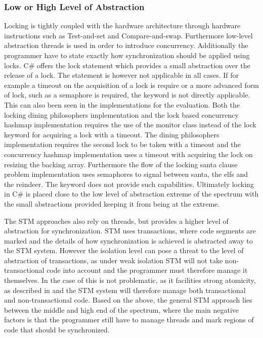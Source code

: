 \subsubsection{Low or High Level of Abstraction}\label{subsec:level_of_abstraction}
Locking is tightly coupled with the hardware architecture through hardware instructions such as Test-and-set and Compare-and-swap\cite[p. 1990]{scott2011sync}. Furthermore low-level abstraction threads is used in order to introduce concurrency. Additionally the programmer have to state exactly how synchronization should be applied using locks. C\# offers the lock  statement which provides a small abstraction over the release of a lock. The  statement is however not applicable in all cases. If for example a timeout on the acquisition of a lock is require or a more advanced form of lock, such as a semaphore is required, the  keyword is not directly applicable. This can also been seen in the implementations for the evaluation. Both the locking dining philosophers implementation and the lock based concurrency hashmap implementation requires the use of the monitor class instead of the lock keyword for acquiring a lock with a timeout. The dining philosophers implementation requires the second lock to be taken with a timeout and the concurrency hashmap implementation uses a timeout with acquiring the lock on resizing the backing array. Furthermore the flow of the locking santa clause problem implementation uses semaphores to signal between santa, the elfs and the reindeer. The  keyword does not provide such capabilities. Ultimately locking in C\# is placed close to the low level of abstraction extreme of the spectrum with the small abstractions provided keeping it from being at the extreme. 

The \ac{STM} approaches also rely on threads, but provides a higher level of abstraction for synchronization. \ac{STM} uses transactions, where code segments are marked and the details of how synchronization is achieved is abstracted away to the \ac{STM} system. However the isolation level can pose a threat to the level of abstraction of transactions, as under weak isolation \ac{STM} will not take non-transactional code into account and the programmer must therefore manage it themselves. In the case of \stmnamesp this is not problematic, as it facilities strong atomicity, as described in  and the \ac{STM} system will therefore manage both transactional and non-transactional code. Based on the above, the general \ac{STM} approach lies between the middle and high end of the spectrum, where the main negative factors is that the programmer still have to manage threads and mark regions of code that should be synchronized.

